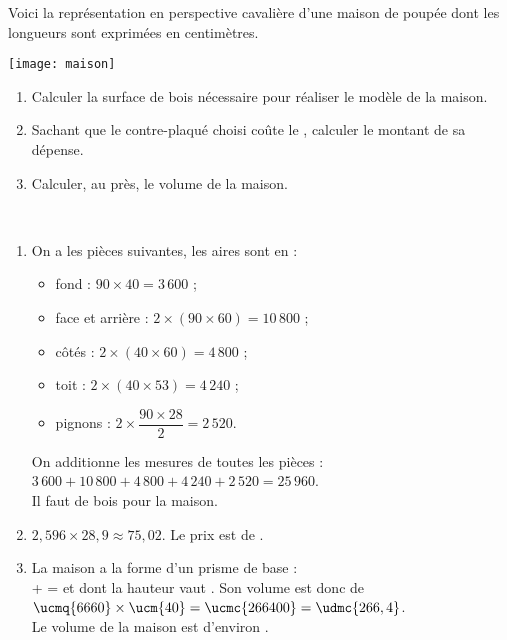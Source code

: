 \begin{colonne*exercice}
\bigskip


\begin{exercice} %
   Voici la représentation en perspective cavalière d'une maison de poupée dont les longueurs sont exprimées en centimètres.
   \begin{center}
      \texttt{[image: maison]}
   \end{center}
   \vspace*{-5mm}
   \begin{enumerate}
      \item Calculer la surface de bois nécessaire pour réaliser le modèle de la maison.
      \item Sachant que le contre-plaqué choisi coûte  le \umq{}, calculer le montant de sa dépense.
      \item Calculer, au \udmc{} près, le volume de la maison.
   \end{enumerate}
\end{exercice}

\begin{corrige}
   \ \\ [-5mm]
   \begin{enumerate}
      \item On a les pièces suivantes, les aires sont en \ucmq{} :
         \begin{itemize}
            \item fond : $90\times40 =3\,600$ ;
            \item face et arrière : $2\times(90\times60) =10\,800$ ;
            \item côtés : $2\times(40\times60) =4\,800$ ; 
            \item toit : $2\times(40\times53) =4\,240$ ; \smallskip
            \item pignons : $2\times\dfrac{90\times28}{2} =2\,520$. \smallskip
         \end{itemize}
         On additionne les mesures de toutes les pièces : \\
         $3\,600+10\,800+4\,800+4\,240+2\,520 =25\,960$. \\
         {\blue Il faut  de bois pour la maison}.
      \item $2,596\times28,9 \approx75,02$. 
      {\blue Le prix est de \approx{}}.
      \item La maison a la forme d'un prisme de base : \\
       +  =  et dont la hauteur vaut . Son volume est donc de $\ucmq{6660}\times\ucm{40} =\ucmc{266400} =\udmc{266,4}$. \\
      {\blue Le volume de la maison est d'environ }.
   \end{enumerate}
\end{corrige}

\end{colonne*exercice}


